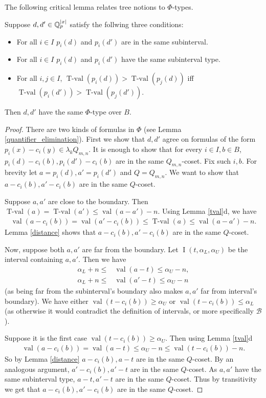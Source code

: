 \documentclass{amsart}
\newcommand{\BB}{\mathscr B}
\DeclareMathOperator{\val}{val}
\DeclareMathOperator{\tval}{T-val}
\DeclareMathOperator{\inti}{I}
\newcommand{\interval}{\inti(t, \alpha_L, \alpha_U)}
\begin{document}
The following critical lemma relates tree notions to $\Phi$-types.
\begin{Lemma} \label{main_lemma}
  Suppose $d, d' \in \mathbb{Q}_p^{|x|}$ satisfy the follwing three conditions:
  \begin{itemize}
  \item For all $i \in I$ $p_i(d)$ and $p_i(d')$ are in the same subinterval.
  \item For all $i \in I$ $p_i(d)$ and $p_i(d')$ have the same subinterval type.
  \item For all $i,j \in I$, $\tval(p_i(d)) > \tval(p_j(d))$ iff $\tval(p_i(d')) > \tval(p_j(d'))$.
  \end{itemize}
  Then $d, d'$ have the same $\Phi$-type over $B$.
\end{Lemma}
\begin{proof}
  There are two kinds of formulas in $\Phi$
  (see Lemma \ref{quantifier_elimination}).
  First we show that $d, d'$ agree on formulas of the form $p_i(x) - c_i(y) \in \lambda_k Q_{m,n}$.
  It is enough to show that for every $i \in I, b \in B$, $p_i(d) - c_i(b), p_i(d') - c_i(b)$ are in the same $Q_{m,n}$-coset.
  Fix such $i, b$.
  For brevity let $a = p_i(d), a' = p_i(d')$ and $Q = Q_{m,n}$.
  We want to show that $a - c_i(b), a' - c_i(b)$ are in the same $Q$-coset.
  
  Suppose $a, a'$ are close to the boundary.
  Then $\tval(a) = \tval(a') \leq \val(a - a') - n$.
  Using Lemma \ref{tval}d, we have
  \begin{align*}
    \val(a - c_i(b)) = \val(a' - c_i(b)) \leq \tval(a) \leq \val(a - a') - n.
  \end{align*}
  Lemma \ref{distance} shows that $a - c_i(b), a' - c_i(b)$ are in the same $Q$-coset.
  
  Now, suppose both $a, a'$ are far from the boundary.
  Let $\interval$ be the interval containing $a, a'$.
  Then we have 
  \begin{align*}
    \alpha_L + n \leq &\val (a - t) \leq \alpha_U - n, \\
    \alpha_L + n \leq &\val (a' - t) \leq \alpha_U - n
  \end{align*}
  (as being far from the subinterval's boundary also makes $a,a'$ far from interval's boundary).
  We have either $\val(t - c_i(b)) \geq \alpha_U$ or $\val(t - c_i(b)) \leq \alpha_L$ (as otherwise it would contradict the definition of intervals, or more specifically $\BB$).
  
  Suppose it is the first case $\val(t - c_i(b)) \geq \alpha_U$.
  Then using Lemma \ref{tval}d
  \begin{align*}
    \val(a - c_i(b)) = \val(a - t) \leq \alpha_U - n \leq \val(t - c_i(b)) - n.
  \end{align*}
  So by Lemma \ref{distance} $a - c_i(b), a - t$ are in the same $Q$-coset.
  By an analogous argument, $a' - c_i(b), a' - t$ are in the same $Q$-coset.
  As $a, a'$ have the same subinterval type, $a - t, a' - t$ are in the same $Q$-coset.
  Thus by transitivity we get that $a - c_i(b), a' - c_i(b)$ are in the same $Q$-coset.
  

\end{proof}
\end{document}
